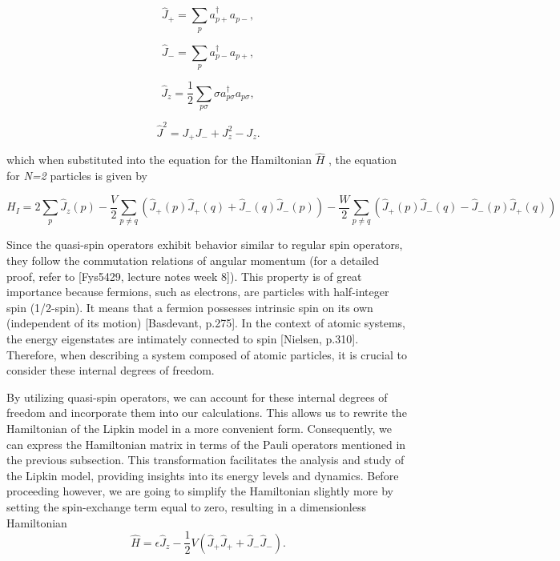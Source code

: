 \documentclass[onecolumn,10pt,cleanfoot]{asme2ej}
\begin{document}
\begin{equation}
\hat{J}_{+} = \sum_{p} a_{p+}^{\dagger}a_{p-},
\end{equation}

\begin{equation}
\hat{J}_{-} = \sum_{p} a_{p-}^{\dagger}a_{p+},
\end{equation}

\begin{equation}
\hat{J}_{z} = \frac{1}{2}\sum_{p\sigma} \sigma a_{p\sigma}^{\dagger}a_{p\sigma}, 
\end{equation}

\begin{equation}
\hat{J}^{2} = J_{+}J_{-} + J_{z}^{2} - J_{z}.
\end{equation}

which when substituted into the equation for the Hamiltonian $\hat{H}$ , the equation for \textit{N=2} particles is given by

\begin{equation}
	H_I = 2\sum_{p}\hat{J}_z(p) - \frac{V}{2}\sum_{p \neq q}(\hat{J}_+(p)\hat{J}_+(q) + \hat{J}_-(q)\hat{J}_-(p)) - \frac{W}{2}\sum_{p \neq q}(\hat{J}_+(p)\hat{J}_-(q) - \hat{J}_-(p)\hat{J}_+(q))
\end{equation}

Since the quasi-spin operators exhibit behavior similar to regular spin operators, they follow the commutation relations of angular momentum (for a detailed proof, refer to [Fys5429, lecture notes week 8]). This property is of great importance because fermions, such as electrons, are particles with half-integer spin (1/2-spin). It means that a fermion possesses intrinsic spin on its own (independent of its motion) [Basdevant, p.275]. In the context of atomic systems, the energy eigenstates are intimately connected to spin [Nielsen, p.310]. Therefore, when describing a system composed of atomic particles, it is crucial to consider these internal degrees of freedom.

By utilizing quasi-spin operators, we can account for these internal degrees of freedom and incorporate them into our calculations. This allows us to rewrite the Hamiltonian of the Lipkin model in a more convenient form. Consequently, we can express the Hamiltonian matrix in terms of the Pauli operators mentioned in the previous subsection. This transformation facilitates the analysis and study of the Lipkin model, providing insights into its energy levels and dynamics. Before proceeding however, we are going to simplify the Hamiltonian slightly more by setting the spin-exchange term equal to zero, resulting in a dimensionless Hamiltonian
\begin{equation}
\hat{H} = \epsilon\hat{J}_z - \frac{1}{2}V(\hat{J}_+\hat{J}_+ + \hat{J}_-\hat{J}_-).
\end{equation}
\end{document}
